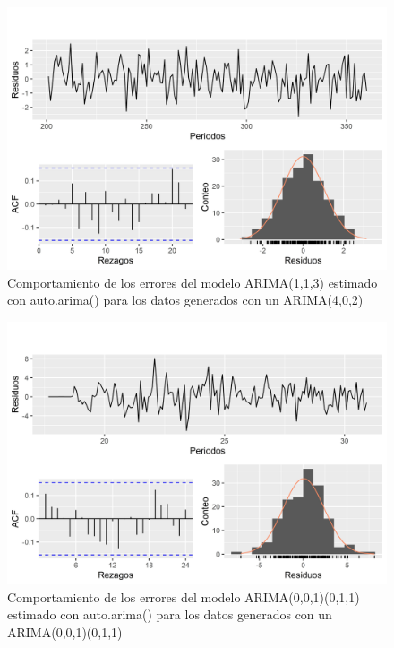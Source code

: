 \documentclass[
]{article}
\begin{document}
\begin{figure}[H]
\includegraphics[width=1\linewidth,height=1\textheight]{Tesis_files/figure-latex/errores_simulados_autoarima4-1} \caption{Comportamiento de los errores del modelo ARIMA(1,1,3) estimado con auto.arima() para los datos generados con un ARIMA(4,0,2)}\label{fig:errores_simulados_autoarima4}
\end{figure}

\begin{figure}[H]
\includegraphics[width=1\linewidth,height=1\textheight]{Tesis_files/figure-latex/errores_simulados_autoarima5-1} \caption{Comportamiento de los errores del modelo ARIMA(0,0,1)(0,1,1) estimado con auto.arima() para los datos generados con un ARIMA(0,0,1)(0,1,1)}\label{fig:errores_simulados_autoarima5}
\end{figure}
\end{document}
